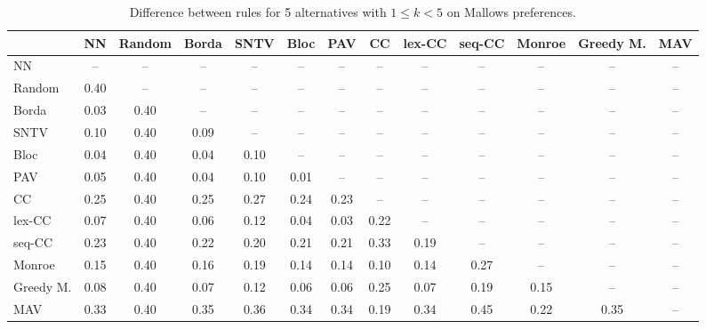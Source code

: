 
\begin{table*}[htbp]
\centering
\begin{tabular}{lcccccccccccc}
\toprule
 & NN & Random & Borda & SNTV & Bloc & PAV & CC & lex-CC & seq-CC & Monroe & Greedy M. & MAV \\
\midrule
NN & -- & -- & -- & -- & -- & -- & -- & -- & -- & -- & -- & -- \\
Random & \cellcolor{blue!40} 0.40 & -- & -- & -- & -- & -- & -- & -- & -- & -- & -- & -- \\
Borda & \cellcolor{blue!3} 0.03 & \cellcolor{blue!40} 0.40 & -- & -- & -- & -- & -- & -- & -- & -- & -- & -- \\
SNTV & \cellcolor{blue!10} 0.10 & \cellcolor{blue!40} 0.40 & \cellcolor{blue!9} 0.09 & -- & -- & -- & -- & -- & -- & -- & -- & -- \\
Bloc & \cellcolor{blue!4} 0.04 & \cellcolor{blue!40} 0.40 & \cellcolor{blue!4} 0.04 & \cellcolor{blue!10} 0.10 & -- & -- & -- & -- & -- & -- & -- & -- \\
PAV & \cellcolor{blue!5} 0.05 & \cellcolor{blue!40} 0.40 & \cellcolor{blue!4} 0.04 & \cellcolor{blue!10} 0.10 & \cellcolor{blue!1} 0.01 & -- & -- & -- & -- & -- & -- & -- \\
CC & \cellcolor{blue!25} 0.25 & \cellcolor{blue!40} 0.40 & \cellcolor{blue!25} 0.25 & \cellcolor{blue!27} 0.27 & \cellcolor{blue!24} 0.24 & \cellcolor{blue!23} 0.23 & -- & -- & -- & -- & -- & -- \\
lex-CC & \cellcolor{blue!7} 0.07 & \cellcolor{blue!40} 0.40 & \cellcolor{blue!6} 0.06 & \cellcolor{blue!12} 0.12 & \cellcolor{blue!4} 0.04 & \cellcolor{blue!3} 0.03 & \cellcolor{blue!22} 0.22 & -- & -- & -- & -- & -- \\
seq-CC & \cellcolor{blue!23} 0.23 & \cellcolor{blue!40} 0.40 & \cellcolor{blue!22} 0.22 & \cellcolor{blue!20} 0.20 & \cellcolor{blue!21} 0.21 & \cellcolor{blue!21} 0.21 & \cellcolor{blue!33} 0.33 & \cellcolor{blue!19} 0.19 & -- & -- & -- & -- \\
Monroe & \cellcolor{blue!15} 0.15 & \cellcolor{blue!40} 0.40 & \cellcolor{blue!16} 0.16 & \cellcolor{blue!19} 0.19 & \cellcolor{blue!14} 0.14 & \cellcolor{blue!14} 0.14 & \cellcolor{blue!10} 0.10 & \cellcolor{blue!14} 0.14 & \cellcolor{blue!27} 0.27 & -- & -- & -- \\
Greedy M. & \cellcolor{blue!8} 0.08 & \cellcolor{blue!40} 0.40 & \cellcolor{blue!7} 0.07 & \cellcolor{blue!12} 0.12 & \cellcolor{blue!6} 0.06 & \cellcolor{blue!6} 0.06 & \cellcolor{blue!25} 0.25 & \cellcolor{blue!7} 0.07 & \cellcolor{blue!19} 0.19 & \cellcolor{blue!15} 0.15 & -- & -- \\
MAV & \cellcolor{blue!33} 0.33 & \cellcolor{blue!40} 0.40 & \cellcolor{blue!35} 0.35 & \cellcolor{blue!36} 0.36 & \cellcolor{blue!34} 0.34 & \cellcolor{blue!34} 0.34 & \cellcolor{blue!19} 0.19 & \cellcolor{blue!34} 0.34 & \cellcolor{blue!45} 0.45 & \cellcolor{blue!22} 0.22 & \cellcolor{blue!35} 0.35 & -- \\
\bottomrule
\end{tabular}

\caption{Difference between rules for 5 alternatives with $1 \leq k < 5$ on Mallows preferences.}
\label{tab:rule_distance_heatmap-m=[5]-pref_dist=MALLOWS-RELPHI-R}
\end{table*}
    